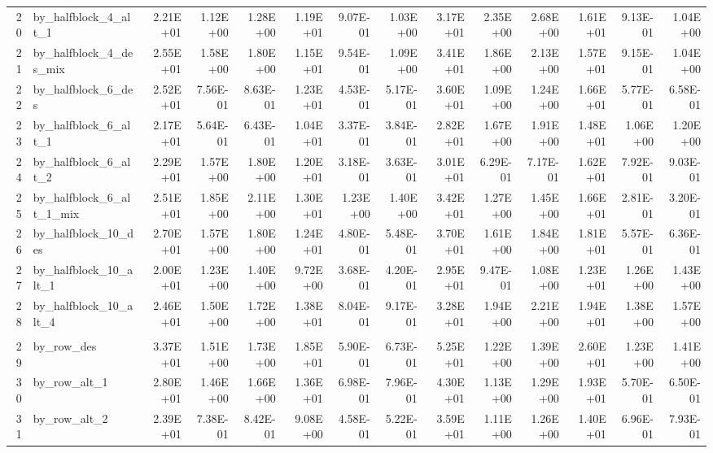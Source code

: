 \documentclass[11pt]{article}
\begin{document}
\begin{table}[htbp]
\begin{tabular}{rlrrrrrrrrrrrr}
    20    & by\_halfblock\_4\_alt\_1 & 2.21E+01 & 1.12E+00 & 1.28E+00 & 1.19E+01 & 9.07E-01 & 1.03E+00 & 3.17E+01 & 2.35E+00 & 2.68E+00 & 1.61E+01 & 9.13E-01 & 1.04E+00 \\
    21    & by\_halfblock\_4\_des\_mix & 2.55E+01 & 1.58E+00 & 1.80E+00 & 1.15E+01 & 9.54E-01 & 1.09E+00 & 3.41E+01 & 1.86E+00 & 2.13E+00 & 1.57E+01 & 9.15E-01 & 1.04E+00 \\
    22    & by\_halfblock\_6\_des & 2.52E+01 & 7.56E-01 & 8.63E-01 & 1.23E+01 & 4.53E-01 & 5.17E-01 & 3.60E+01 & 1.09E+00 & 1.24E+00 & 1.66E+01 & 5.77E-01 & 6.58E-01 \\
    23    & by\_halfblock\_6\_alt\_1 & 2.17E+01 & 5.64E-01 & 6.43E-01 & 1.04E+01 & 3.37E-01 & 3.84E-01 & 2.82E+01 & 1.67E+00 & 1.91E+00 & 1.48E+01 & 1.06E+00 & 1.20E+00 \\
    24    & by\_halfblock\_6\_alt\_2 & 2.29E+01 & 1.57E+00 & 1.80E+00 & 1.20E+01 & 3.18E-01 & 3.63E-01 & 3.01E+01 & 6.29E-01 & 7.17E-01 & 1.62E+01 & 7.92E-01 & 9.03E-01 \\
    25    & by\_halfblock\_6\_alt\_1\_mix & 2.51E+01 & 1.85E+00 & 2.11E+00 & 1.30E+01 & 1.23E+00 & 1.40E+00 & 3.42E+01 & 1.27E+00 & 1.45E+00 & 1.66E+01 & 2.81E-01 & 3.20E-01 \\
    26    & by\_halfblock\_10\_des & 2.70E+01 & 1.57E+00 & 1.80E+00 & 1.24E+01 & 4.80E-01 & 5.48E-01 & 3.70E+01 & 1.61E+00 & 1.84E+00 & 1.81E+01 & 5.57E-01 & 6.36E-01 \\
    27    & by\_halfblock\_10\_alt\_1 & 2.00E+01 & 1.23E+00 & 1.40E+00 & 9.72E+00 & 3.68E-01 & 4.20E-01 & 2.95E+01 & 9.47E-01 & 1.08E+00 & 1.23E+01 & 1.26E+00 & 1.43E+00 \\
    28    & by\_halfblock\_10\_alt\_4 & 2.46E+01 & 1.50E+00 & 1.72E+00 & 1.38E+01 & 8.04E-01 & 9.17E-01 & 3.28E+01 & 1.94E+00 & 2.21E+00 & 1.94E+01 & 1.38E+00 & 1.57E+00 \\
          &       &       &       &       &       &       &       &       &       &       &       &       &  \\
    29    & by\_row\_des & 3.37E+01 & 1.51E+00 & 1.73E+00 & 1.85E+01 & 5.90E-01 & 6.73E-01 & 5.25E+01 & 1.22E+00 & 1.39E+00 & 2.60E+01 & 1.23E+00 & 1.41E+00 \\
    30    & by\_row\_alt\_1 & 2.80E+01 & 1.46E+00 & 1.66E+00 & 1.36E+01 & 6.98E-01 & 7.96E-01 & 4.30E+01 & 1.13E+00 & 1.29E+00 & 1.93E+01 & 5.70E-01 & 6.50E-01 \\
    31    & by\_row\_alt\_2 & 2.39E+01 & 7.38E-01 & 8.42E-01 & 9.08E+00 & 4.58E-01 & 5.22E-01 & 3.59E+01 & 1.11E+00 & 1.26E+00 & 1.40E+01 & 6.96E-01 & 7.93E-01 \\

\end{tabular}
\end{table}
\end{document}
